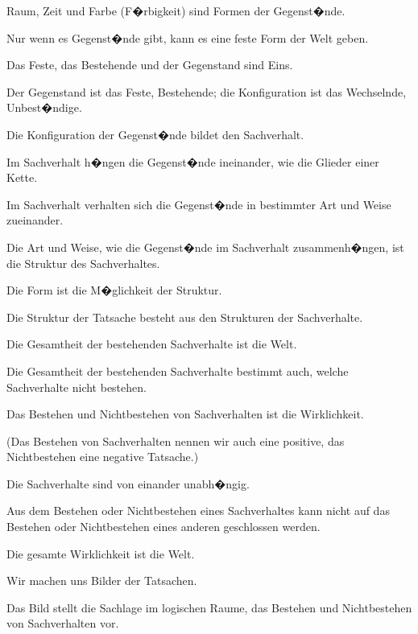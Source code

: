 \begin{propositions}
{Raum, Zeit und Farbe (F�rbigkeit) sind Formen
der Gegenst�nde.}


{Nur wenn es Gegenst�nde gibt, kann es eine
feste Form der Welt geben.}


{Das Feste, das Bestehende und der Gegenstand
sind Eins.}


{Der Gegenstand ist das Feste, Bestehende; die
Konfiguration ist das Wechselnde, Unbest�ndige.}


{Die Konfiguration der Gegenst�nde bildet den
Sachverhalt.}


{Im Sachverhalt h�ngen die Gegenst�nde ineinander,
wie die Glieder einer Kette.}


{Im Sachverhalt verhalten sich die Gegenst�nde
in bestimmter Art und Weise zueinander.}


{Die Art und Weise, wie die Gegenst�nde im
Sachverhalt zusammenh�ngen, ist die Struktur
des Sachverhaltes.}


{Die Form ist die M�glichkeit der Struktur.}


{Die Struktur der Tatsache besteht aus den
Strukturen der Sachverhalte.}


{Die Gesamtheit der bestehenden Sachverhalte
ist die Welt.}


{Die Gesamtheit der bestehenden Sachverhalte
bestimmt auch, welche Sachverhalte nicht bestehen.}


{Das Bestehen und Nichtbestehen von Sachverhalten
ist die Wirklichkeit.

(Das Bestehen von Sachverhalten nennen wir
auch eine positive, das Nichtbestehen eine negative
Tatsache.)}


{Die Sachverhalte sind von einander unabh�ngig.}


{Aus dem Bestehen oder Nichtbestehen eines
Sachverhaltes kann nicht auf das Bestehen oder
Nichtbestehen eines anderen geschlossen werden.}


{Die gesamte Wirklichkeit ist die Welt.}


{Wir machen uns Bilder der Tatsachen.}


{Das Bild stellt die Sachlage im logischen Raume,
das Bestehen und Nichtbestehen von Sachverhalten
vor.}



\end{propositions}
